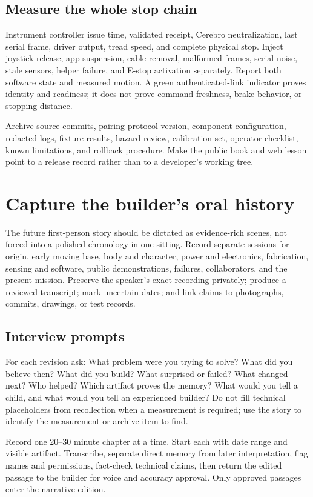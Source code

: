 \section{Measure the whole stop chain}

Instrument controller issue time, validated receipt, Cerebro neutralization, last serial frame, driver output, tread speed, and complete physical stop. Inject joystick release, app suspension, cable removal, malformed frames, serial noise, stale sensors, helper failure, and E-stop activation separately. Report both software state and measured motion. A green authenticated-link indicator proves identity and readiness; it does not prove command freshness, brake behavior, or stopping distance.

\begin{advancedbox}[title={RELEASE ARTIFACTS}]
Archive source commits, pairing protocol version, component configuration, redacted logs, fixture results, hazard review, calibration set, operator checklist, known limitations, and rollback procedure. Make the public book and web lesson point to a release record rather than to a developer's working tree.
\end{advancedbox}

\chapter{Capture the builder's oral history}

The future first-person story should be dictated as evidence-rich scenes, not forced into a polished chronology in one sitting. Record separate sessions for origin, early moving base, body and character, power and electronics, fabrication, sensing and software, public demonstrations, failures, collaborators, and the present mission. Preserve the speaker's exact recording privately; produce a reviewed transcript; mark uncertain dates; and link claims to photographs, commits, drawings, or test records.

\section{Interview prompts}

For each revision ask: What problem were you trying to solve? What did you believe then? What did you build? What surprised or failed? What changed next? Who helped? Which artifact proves the memory? What would you tell a child, and what would you tell an experienced builder? Do not fill technical placeholders from recollection when a measurement is required; use the story to identify the measurement or archive item to find.

\begin{missionbox}[title={DICTATION WORKFLOW FOR THE NEXT EDITION}]
Record one 20--30 minute chapter at a time. Start each with date range and visible artifact. Transcribe, separate direct memory from later interpretation, flag names and permissions, fact-check technical claims, then return the edited passage to the builder for voice and accuracy approval. Only approved passages enter the narrative edition.
\end{missionbox}

